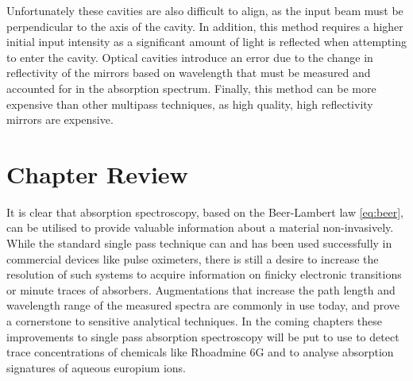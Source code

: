 
Unfortunately these cavities are also difficult to align, as the input beam
must be perpendicular to the axis of the cavity. In addition, this method
requires a higher initial input intensity as a significant amount of light is
reflected when attempting to enter the cavity. Optical cavities introduce an
error due to the change in reflectivity of the mirrors based on wavelength that
must be measured and accounted for in the absorption spectrum. Finally, this
method can be more expensive than other multipass techniques, as high quality,
high reflectivity mirrors are expensive.




\section*{Chapter Review}

It is clear that absorption spectroscopy, based on the Beer-Lambert law
\eqref{eq:beer}, can be utilised to provide valuable information about a
material non-invasively. While the standard single pass technique can and has
been used successfully in commercial devices like pulse oximeters, there is
still a desire to increase the resolution of such systems to acquire
information on finicky electronic transitions or minute traces of absorbers.
Augmentations that increase the path length and wavelength range of the
measured spectra are commonly in use today, and prove a cornerstone to
sensitive analytical techniques. In the coming chapters these improvements to
single pass absorption spectroscopy will be put to use to detect trace
concentrations of chemicals like Rhoadmine 6G and to analyse absorption
signatures of aqueous europium ions.
